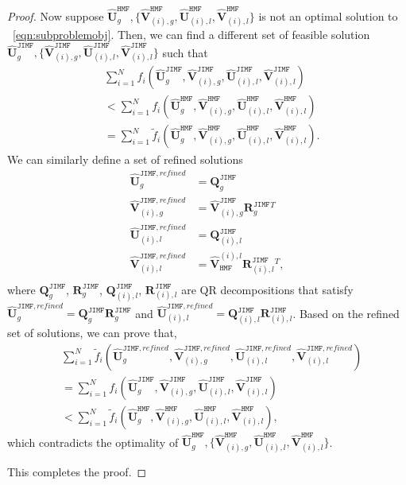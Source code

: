 \documentclass[twoside,11pt]{article}
\def\inneralg{\texttt{JIMF}\xspace}
\def\hmf{\texttt{HMF}\xspace}
\newcommand{\matQ}{\mathbf{Q}}
\newcommand{\matR}{\mathbf{R}}
\newcommand{\hmatU}{\hat{\mathbf{U}}}
\newcommand{\hmatV}{\hat{\mathbf{V}}}
\newcommand{\tf}{\tilde{f}}
\begin{document}
\begin{proof}
Now suppose $\hmatU_g^{\hmf},\{\hmatV^{\hmf}_{(i),g},\hmatU^{\hmf}_{(i),l},\hmatV^{\hmf}_{(i),l}\}$ is not an optimal solution to ~\eqref{eqn:subproblemobj}. Then, we can find a different set of feasible solution $\hmatU_g^{\inneralg},\{\hmatV^{\inneralg}_{(i),g},\hmatU^{\inneralg}_{(i),l},\hmatV^{\inneralg}_{(i),l}\}$ such that
$$
\begin{aligned}
&\sum_{i=1}^N f_i\left(\hmatU^{\inneralg}_g,\hmatV^{\inneralg}_{(i),g},\hmatU^{\inneralg}_{(i),l},\hmatV^{\inneralg}_{(i),l}\right)\\
&< \sum_{i=1}^Nf_i\left(\hmatU^{\hmf}_g,\hmatV_{(i),g}^{\hmf},\hmatU^{\hmf}_{(i),l},\hmatV^{\hmf}_{(i),l}\right) \\
& = \sum_{i=1}^N\tf_i\left(\hmatU^{\hmf}_g,\hmatV_{(i),g}^{\hmf},\hmatU^{\hmf}_{(i),l},\hmatV^{\hmf}_{(i),l}\right).
\end{aligned}
$$
We can similarly define a set of refined solutions 
\begin{equation*}
\begin{aligned}
\hmatU_g^{\inneralg, refined} &= \matQ^{\inneralg}_g\\
\hmatV^{\inneralg, refined}_{(i),g} &= \hmatV_{(i),g}^{\inneralg} \matR_g^{\inneralg}{}^{T}\\
\hmatU^{\inneralg, refined}_{(i),l} &= \matQ^{\inneralg}_{(i),l}\\
\hmatV^{\inneralg, refined}_{(i),l} &= \hmatV^{(i),l}_{\hmf} \matR_{(i),l}^{\inneralg}{}^{T},\\
\end{aligned}
\end{equation*}
where $\matQ^{\inneralg}_g$, $\matR_g^{\inneralg}$, $\matQ^{\inneralg}_{(i),l}$, $\matR_{(i),l}^{\inneralg}$ are QR decompositions that satisfy $\hmatU_g^{\inneralg, refined}=\matQ^{\inneralg}_g\matR_g^{\inneralg}$ and $\hmatU^{\inneralg, refined}_{(i),l} =\matQ^{\inneralg}_{(i),l}\matR_{(i),l}^{\inneralg}$. Based on the refined set of solutions, we can prove that,
$$
\begin{aligned}
&\sum_{i=1}^N \tf_i\left(\hmatU^{\inneralg, refined}_g,\hmatV^{\inneralg, refined}_{(i),g},\hmatU^{\inneralg, refined}_{(i),l},\hmatV^{\inneralg, refined}_{(i),l}\right)\\
&=\sum_{i=1}^N f_i\left(\hmatU^{\inneralg}_g,\hmatV^{\inneralg}_{(i),g},\hmatU^{\inneralg}_{(i),l},\hmatV^{\inneralg}_{(i),l}\right)\\
& < \sum_{i=1}^N\tf_i\left(\hmatU^{\hmf}_g,\hmatV_{(i),g}^{\hmf},\hmatU^{\hmf}_{(i),l},\hmatV^{\hmf}_{(i),l}\right),
\end{aligned}
$$
which contradicts the optimality of $\hmatU_g^{\hmf},\{\hmatV^{\hmf}_{(i),g},\hmatU^{\hmf}_{(i),l},\hmatV^{\hmf}_{(i),l}\}$.

This completes the proof.
\end{proof}
\end{document}

